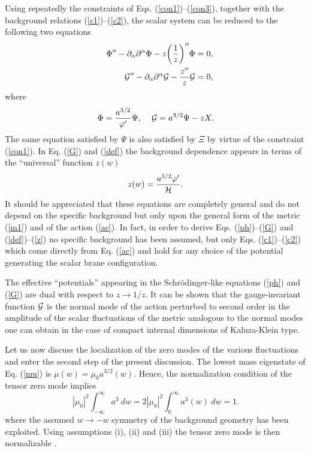 \documentclass[a4paper,12pt]{article}
\begin{document}
Using repeatedly the constraints of Eqs. (\ref{con1})--(\ref{con3}), 
together with the background relations (\ref{c1})--(\ref{c2}), 
the scalar system can be reduced to the following two equations
\begin{eqnarray}
&& \Phi'' - \partial_{\alpha}\partial^{\alpha} \Phi - 
z\biggl(\frac{1}{z}\biggr)'' \Phi =0,
\label{ph}\\
&& {\cal G}'' - \partial_{\alpha}\partial^{\alpha}{\cal G}
- \frac{z''}{z} {\cal G} =0,
\label{G}
\end{eqnarray}
where 
\begin{equation}
\Phi= \frac{a^{3/2}}{\varphi'} \Psi,\,\,\,\,\,\,\,{\cal G} = 
a^{3/2} \Psi - z X.
\label{def}
\end{equation}
The same equation satisfied by $\Psi$ is also satisfied by $\Xi$ by virtue 
of the constraint (\ref{con1}).
In Eq. (\ref{G}) and (\ref{def}) the background dependence appears in terms 
of the ``universal'' function $z(w)$ 
\begin{equation}
z(w) = \frac{a^{3/2} \varphi'}{{\cal H}}.
\label{z}
\end{equation}
It should be appreciated that these equations are completely general
and do not depend on the specific background but only upon the general
form of the metric (\ref{m1}) and of the action (\ref{ac}). In fact, in order
to derive Eqs. (\ref{ph})--(\ref{G}) and (\ref{def})--(\ref{z}) 
no specific background has been assumed, but only Eqs. (\ref{c1})--(\ref{c2}) 
which come directly from Eq. (\ref{ac}) and hold for any choice of the 
potential generating the scalar brane configuration.

The effective ``potentials'' appearing 
in the Schr\"odinger-like equations (\ref{ph}) and (\ref{G}) are dual 
with respect to $z\rightarrow 1/z$. It can be shown that the 
 gauge-invariant function ${\cal G}$  is the normal mode of the  
action perturbed to second order 
in the amplitude of the scalar fluctuations of the metric analogous 
to the normal modes one can obtain in the case of compact internal 
dimensions \cite{mg} of Kaluza-Klein type.

Let us now discuss the localization of the zero modes of the various 
fluctuations and enter the second step of the present discussion.
The lowest mass eigenstate of Eq. (\ref{mu}) 
is  $\mu(w) = {\mu_0} a^{3/2}(w)$. Hence, the normalization 
condition of the tensor zero mode implies 
\begin{equation}
|\mu_0|^2 \int_{-\infty}^{\infty} a^3 ~dw = 2 |\mu_0|^2\int_{0}^{\infty}a^3(w)
~ dw=1 .
\end{equation} 
where the assumed $w\rightarrow -w $ symmetry of the background geometry 
has been exploited. Using assumptions (i), (ii) and (iii) the tensor 
zero mode is then normalizable \cite{rusu1,rusu2}. 
\end{document}
